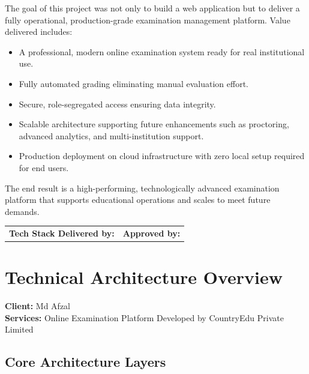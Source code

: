 \documentclass[12pt,a4paper]{article}
\begin{document}
The goal of this project was not only to build a web application but to deliver a fully operational, production-grade examination management platform. Value delivered includes:

\begin{itemize}[leftmargin=1.5em]
  \item A professional, modern online examination system ready for real institutional use.
  \item Fully automated grading eliminating manual evaluation effort.
  \item Secure, role-segregated access ensuring data integrity.
  \item Scalable architecture supporting future enhancements such as proctoring, advanced analytics, and multi-institution support.
  \item Production deployment on cloud infrastructure with zero local setup required for end users.
\end{itemize}

\begin{notebox}
The end result is a high-performing, technologically advanced examination platform that supports educational operations and scales to meet future demands.
\end{notebox}

\vspace{1.5cm}
\noindent\begin{tabular}{p{7cm} p{7cm}}
  \textbf{Tech Stack Delivered by:} \hrulefill & \textbf{Approved by:} \hrulefill \\
\end{tabular}

\newpage


\section{Technical Architecture Overview}

\textbf{Client:} Md Afzal\\
\textbf{Services:} Online Examination Platform Developed by CountryEdu Private Limited

\subsection{Core Architecture Layers}
\end{document}
